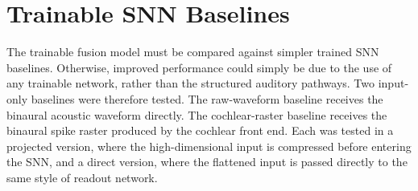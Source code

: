\section{Trainable SNN Baselines}

The trainable fusion model must be compared against simpler trained SNN baselines. Otherwise, improved performance could simply be due to the use of any trainable network, rather than the structured auditory pathways. Two input-only baselines were therefore tested. The raw-waveform baseline receives the binaural acoustic waveform directly. The cochlear-raster baseline receives the binaural spike raster produced by the cochlear front end. Each was tested in a projected version, where the high-dimensional input is compressed before entering the SNN, and a direct version, where the flattened input is passed directly to the same style of readout network.

